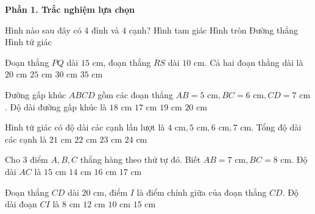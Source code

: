\textbf{Phần 1. Trắc nghiệm lựa chọn}

\begin{ex} %
Hình nào sau đây có 4 đỉnh và 4 cạnh?
\choice
{Hình tam giác}
{Hình tròn}
{Đường thẳng}
{\True Hình tứ giác}
\end{ex}

\begin{ex} %
Đoạn thẳng $PQ$ dài $15\text{ cm}$, đoạn thẳng $RS$ dài $10\text{ cm}$. Cả hai đoạn thẳng dài là
\choice
{$20\text{ cm}$}
{\True $25\text{ cm}$}
{$30\text{ cm}$}
{$35\text{ cm}$}
\end{ex}

\begin{ex} %
Đường gấp khúc $ABCD$ gồm các đoạn thẳng $AB = 5\text{ cm}, BC = 6\text{ cm}, CD = 7\text{ cm}$. Độ dài đường gấp khúc là
\choice
{\True $18\text{ cm}$}
{$17\text{ cm}$}
{$19\text{ cm}$}
{$20\text{ cm}$}
\end{ex}

\begin{ex} %
Hình tứ giác có độ dài các cạnh lần lượt là $4\text{ cm}, 5\text{ cm}, 6\text{ cm}, 7\text{ cm}$. Tổng độ dài các cạnh là
\choice
{$21\text{ cm}$}
{\True $22\text{ cm}$}
{$23\text{ cm}$}
{$24\text{ cm}$}
\end{ex}

\begin{ex} %
Cho 3 điểm $A, B, C$ thẳng hàng theo thứ tự đó. Biết $AB = 7\text{ cm}, BC = 8\text{ cm}$. Độ dài $AC$ là
\choice
{\True $15\text{ cm}$}
{$14\text{ cm}$}
{$16\text{ cm}$}
{$17\text{ cm}$}
\end{ex}

\begin{ex} %
Đoạn thẳng $CD$ dài $20\text{ cm}$, điểm $I$ là điểm chính giữa của đoạn thẳng $CD$. Độ dài đoạn $CI$ là
\choice
{$8\text{ cm}$}
{$12\text{ cm}$}
{\True $10\text{ cm}$}
{$15\text{ cm}$}
\end{ex}

